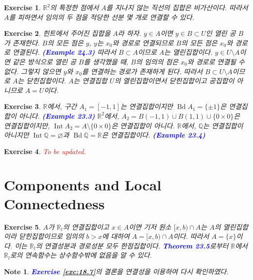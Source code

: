 \documentclass{article}
\newtheorem{exercise}{Exercise}[section]
\newtheorem*{note}{Note}
\newcommand{\Q}{\mathbb{Q}}
\newcommand{\R}{\mathbb{R}}
\begin{document}
\begin{exercise}
    $\R^2$의 특정한 점에서 $A$를 지나지 않는 직선의 집합은 비가산이다. 따라서 $A$를 피하면서 임의의 두 점을 적당한 선분 몇 개로 연결할 수 있다.
\end{exercise}

\begin{exercise}
	\label{exc:24.10}
    힌트에서 주어진 집합을 $A$라 하자. $y\in A$이면 $y\in B\subset U$인 열린 공 $B$가 존재한다. $B$의 모든 점은 $y$, $y$는 $x_0$와 경로로 연결되므로 $B$의 모든 점은 $x_0$와 경로로 연결된다. \textcolor{blue}{\textbf{(Example 24.3)}} 따라서 $B\subset A$이므로 $A$는 열린집합이다. $y\in U\setminus A$이면 같은 방식으로 열린 공 $B$를 생각했을 때, $B$의 임의의 점은 $x_0$와 경로로 연결될 수 없다. 그렇지 않으면 $y$와 $x_0$를 연결하는 경로가 존재하게 된다. 따라서 $B\subset U\setminus A$이므로 $A$는 닫힌집합이다. $A$는 연결집합 $U$의 열린집합이면서 닫힌집합이고 공집합이 아니므로 $A=U$이다.
\end{exercise}

\begin{exercise}
    $\R$에서, 구간 $A_1=[-1,1]$는 연결집합이지만 $\operatorname{Bd}A_1=\{\pm1\}$은 연결집합이 아니다. \textcolor{blue}{\textbf{(Example 23.3)}} $\R^2$에서, $A_2=B(-1,1)\cup B(1,1)\cup\{0\times 0\}$은 연결집합이지만, $\operatorname{Int}A_2=A\setminus\{0\times0\}$은 연결집합이 아니다. $\R$에서, $\Q$는 연결집합이 아니지만 $\operatorname{Int}\Q=\varnothing$과 $\operatorname{Bd}\Q=\R$은 연결집합이다. \textcolor{blue}{\textbf{(Example 23.4)}}
\end{exercise}

\begin{exercise}
    \textcolor{red}{To be updated.}
\end{exercise}

\section{Components and Local Connectedness}

\begin{exercise}
    $A$가 $\R_l$의 연결집합이고 $x\in A$이면 기저 원소 $[x,b)\cap A$는 $A$의 열린집합이라 닫힌집합이므로 임의의 $b>x$에 대하여 $A=[x,b)\cap A$이다. 따라서 $A=\{x\}$이다. 이는 $\R_l$의 연결성분과 경로성분 모두 한점집합이다. \textcolor{blue}{\textbf{Theorem 23.5}}로부터 $\R$에서 $\R_l$로의 연속함수는 상수함수밖에 없음을 알 수 있다.
\end{exercise}
\begin{note}
    \textcolor{blue}{\textbf{Exercise \ref{exc:18.7}}}의 결론을 연결성을 이용하여 다시 확인하였다.
\end{note}
\end{document}
